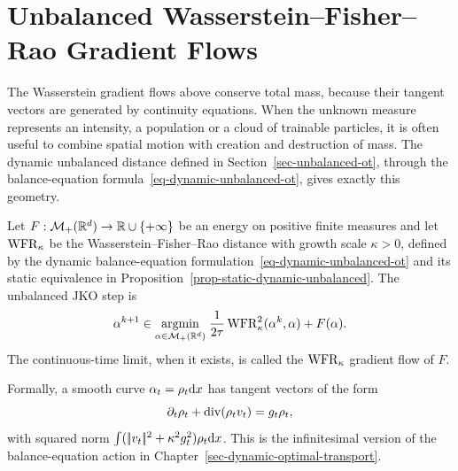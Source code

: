 \section{Unbalanced Wasserstein--Fisher--Rao Gradient Flows}

The Wasserstein gradient flows above conserve total mass, because their tangent vectors are generated by continuity equations. When the unknown measure represents an intensity, a population or a cloud of trainable particles, it is often useful to combine spatial motion with creation and destruction of mass. The dynamic unbalanced distance defined in Section~\ref{sec-unbalanced-ot}, through the balance-equation formula~\eqref{eq-dynamic-unbalanced-ot}, gives exactly this geometry.

\begin{defn}\label{def-wfr-jko-gradient-flow}
	Let $F:\mathcal{M}_+(\mathbb{R}^d)\to\mathbb{R}\cup\{+\infty\}$ be an energy on positive finite measures and let $\operatorname{WFR}_\kappa$ be the Wasserstein--Fisher--Rao distance with growth scale $\kappa>0$, defined by the dynamic balance-equation formulation~\eqref{eq-dynamic-unbalanced-ot} and its static equivalence in Proposition~\ref{prop-static-dynamic-unbalanced}. The unbalanced JKO step is
	\begin{equation}\label{eq-wfr-jko}
		\alpha^{k+1}
		\in
		\underset{\alpha\in\mathcal{M}_+(\mathbb{R}^d)}{\operatorname{argmin}}\;
		\frac{1}{2\tau}\operatorname{WFR}_\kappa^2(\alpha^k,\alpha)+F(\alpha).
	\end{equation}
	The continuous-time limit, when it exists, is called the $\operatorname{WFR}_\kappa$ gradient flow of $F$.
\end{defn}

Formally, a smooth curve $\alpha_t=\rho_t\mathrm{d} x$ has tangent vectors of the form
\[
	\partial_t\rho_t+\operatorname{div}(\rho_t v_t)=g_t\rho_t,
\]
with squared norm $\int(|\!| v_t |\!|^2+\kappa^2 g_t^2)\rho_t\mathrm{d} x$. This is the infinitesimal version of the balance-equation action in Chapter~\ref{sec-dynamic-optimal-transport}.

